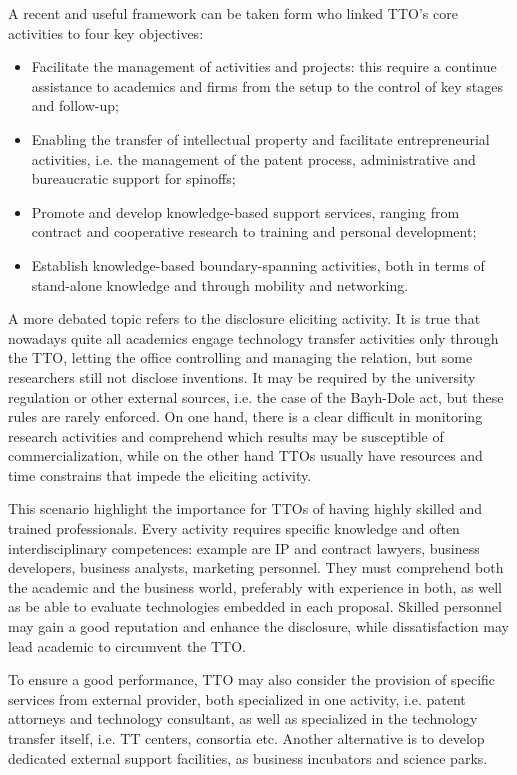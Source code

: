 A recent and useful framework can be taken form \citet{Alexander2013}who linked TTO's core activities to four key objectives: 
\begin{itemize}
\item Facilitate the management of activities and projects: this require a continue assistance to academics and firms from the setup to the control of key stages and follow-up;
\item Enabling the transfer of intellectual property and facilitate entrepreneurial activities, i.e. the management of the patent process, administrative and bureaucratic support for spinoffs;
\item Promote and develop knowledge-based support services, ranging from contract and cooperative research to training and personal development;
\item Establish knowledge-based boundary-spanning activities, both in terms of stand-alone knowledge and through mobility and networking. 
\end{itemize}

A more debated topic refers to the disclosure eliciting activity. It is true that nowadays quite all academics engage technology transfer activities only through the TTO, letting the office controlling and managing the relation, but some researchers still not disclose inventions. It may be required by the university regulation or other external sources, i.e. the case of the Bayh-Dole act, but these rules are rarely enforced. On one hand, there is a clear difficult in monitoring research activities and comprehend which results may be susceptible of commercialization, while on the other hand TTOs usually have resources and time constrains that impede the eliciting activity. 

This scenario highlight the importance for TTOs of having highly skilled and trained professionals. Every activity requires specific knowledge and often interdisciplinary competences: example are IP and contract lawyers, business developers, business analysts, marketing personnel. They must comprehend both the academic and the business world, preferably with experience in both, as well as be able to evaluate technologies embedded in each proposal. Skilled personnel may gain a good reputation and enhance the disclosure, while dissatisfaction may lead academic to circumvent the TTO. 

To ensure a good performance, TTO may also consider the provision of specific services from external provider, both specialized in one activity, i.e. patent attorneys and technology consultant, as well as specialized in the technology transfer itself, i.e. TT centers, consortia etc. Another alternative is to develop dedicated external support facilities, as business incubators and science parks.

